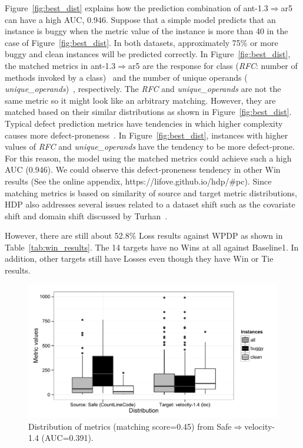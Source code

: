 Figure~\ref{fig:best_dist} explains how the prediction
combination of ant-1.3$\Rightarrow$ar5 can have a high AUC, 0.946. Suppose
that a simple model predicts that an instance is buggy when the metric value of
the instance is more than 40 in the case of Figure~\ref{fig:best_dist}. In both
datasets, approximately 75\% or more buggy and clean instances will be
predicted correctly. In Figure~\ref{fig:best_dist}, the matched metrics in
ant-1.3$\Rightarrow$ar5 are the response for class ({\em RFC}: number of methods
invoked by a class)~\cite{Chidamber94} and the number of unique operands ({\em
unique\_operands})~\cite{Halstead77}, respectively. The {\em RFC} and {\em
unique\_operands} are not the same metric so it might look like an arbitrary
matching. However, they are matched based on their similar distributions as
shown in Figure~\ref{fig:best_dist}. Typical defect prediction metrics have
tendencies in which higher complexity causes more
defect-proneness~\cite{DAmbros12,Menzies07,Rahman13}. In
Figure~\ref{fig:best_dist}, instances with higher values of {\em RFC} and {\em
unique\_operands} have the tendency to be more defect-prone. For this reason, the
model using the matched metrics could achieve such a high AUC (0.946). We could
observe this defect-proneness tendency in other Win results (See the online appendix, https://lifove.github.io/hdp/\#pc). Since matching metrics is
based on similarity of source and target metric distributions, HDP also
addresses several issues related to a dataset shift such as the covariate shift
and domain shift discussed by Turhan~\cite{Turhan12}.



However, there are still about 52.8\% Loss results against WPDP as shown in Table~\ref{tab:win_results}. The 14 targets have no Wins at all against Baseline1. In
addition, other targets still have Losses even though they have Win or Tie
results.


\begin{figure}[t]
	\centering
	\includegraphics[width=\linewidth]{Figures/Result/loss_dist_bplot.pdf}
	\caption{Distribution of metrics (matching score=0.45)
	from Safe$\Rightarrow$velocity-1.4 (AUC=0.391).}
	\label{fig:loss_dist}
\end{figure}


